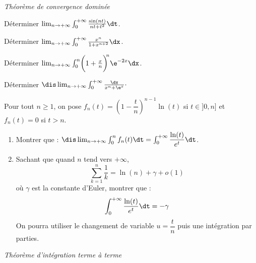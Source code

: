 \documentclass[a4paper,10pt]{report}
\begin{document}
\medskip

\begin{center}
\textit{{ {\large Théorème de convergence dominée}}}
\end{center}

\medskip

\begin{Exa} Déterminer $\lim_{n \to + \infty} \int_{0}^{ + \infty} \frac{\sin(nt)}{nt + t^{2}} \dt$.
\end{Exa}



\begin{Exa} Déterminer $\lim_{n \rightarrow + \infty}\int_{0}^{ + \infty} \frac{x^{n}}{1 + x^{n + 2}} \dx$.
\end{Exa}





\begin{Exa} Déterminer $\lim_{n \to + \infty} \int_{0}^{n} \biggl( 1 + \frac{x}{n} \biggr)^{\!\!n} \e^{ - 2x} \dx$.
\end{Exa}



 \begin{Exa} Déterminer $\dis \lim_{n \rightarrow + \infty} \int_{0}^{ + \infty} \frac{\dx}{x^{n} + \e^{x}} \cdot$
 \end{Exa}
 


\begin{Exa}
Pour tout $n \geq 1$, on pose $f_n(t) = \left( 1 - \dfrac{t}{n} \right)^{n-1}\ln(t)$ si $t \in ]0,n]$ et $f_n(t)=0$ si $t>n$.
\begin{enumerate}
\item Montrer que : $\dis \lim_{n \rightarrow + \infty} \int_{0}^n f_n(t) \dt = \int_{0}^{+ \infty} \dfrac{\ln(t)}{e^t} \dt$.
\item Sachant que quand $n$ tend vers $+ \infty$,
$$ \sum_{k=1}^n \dfrac{1}{k} = \ln(n)+ \gamma + o(1)$$
où $\gamma$ est la constante d'Euler, montrer que :
$$ \int_{0}^{+ \infty} \dfrac{\ln(t)}{e^t} \dt = - \gamma$$
On pourra utiliser le changement de variable $u=\dfrac{t}{n}$ puis une intégration par parties.
\end{enumerate}
\end{Exa}



\medskip

\begin{center}
\textit{{ {\large Théorème d'intégration terme à terme}}}
\end{center}
\end{document}
